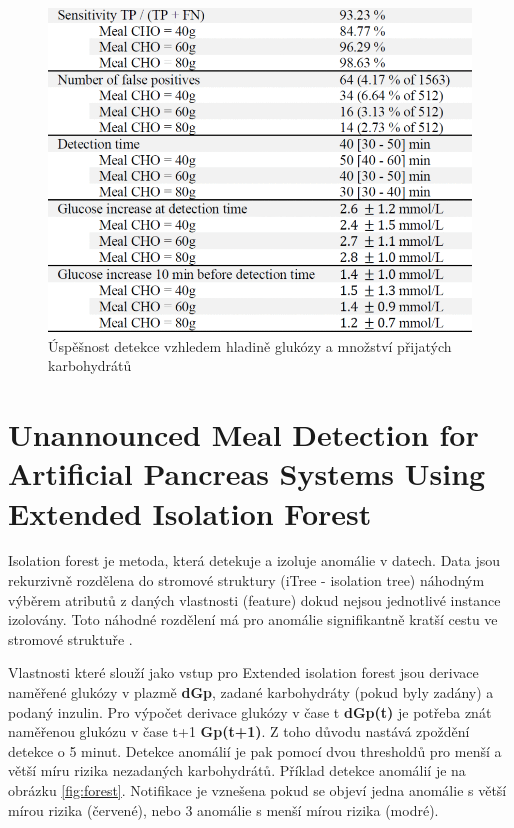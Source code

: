 \begin{figure}[H]
\caption{Úspěšnost detekce vzhledem hladině glukózy a množství přijatých karbohydrátů}
\label{fig:nekonzistence}
\includegraphics[width=1\textwidth]{img/analyza/nekonzistence.png}
\end{figure}


\section{Unannounced Meal Detection for Artificial Pancreas Systems Using Extended Isolation Forest \citep{Analyza.ExtendedIsolationForest}}
\label{ch:forest}

Isolation forest je metoda, která detekuje a izoluje anomálie v datech. Data jsou rekurzivně rozdělena do stromové struktury (iTree - isolation tree) náhodným výběrem atributů z daných vlastnosti (feature) dokud nejsou jednotlivé instance izolovány. Toto náhodné rozdělení má pro anomálie signifikantně kratší cestu ve stromové struktuře \citep{Analyza.IsolationForest}.

Vlastnosti které slouží jako vstup pro Extended isolation forest jsou derivace naměřené glukózy v plazmě \textbf{dGp}, zadané karbohydráty (pokud byly zadány) a podaný inzulin. Pro výpočet derivace glukózy v čase t \textbf{dGp(t)} je potřeba znát naměřenou glukózu v čase t+1 \textbf{Gp(t+1)}. Z toho důvodu nastává zpoždění detekce o 5 minut. Detekce anomálií je pak pomocí dvou thresholdů pro menší a větší míru rizika nezadaných karbohydrátů.
Příklad detekce anomálií je na obrázku \ref{fig:forest}. Notifikace je vznešena pokud se objeví jedna anomálie s větší mírou rizika (červené), nebo 3 anomálie s menší mírou rizika (modré).

